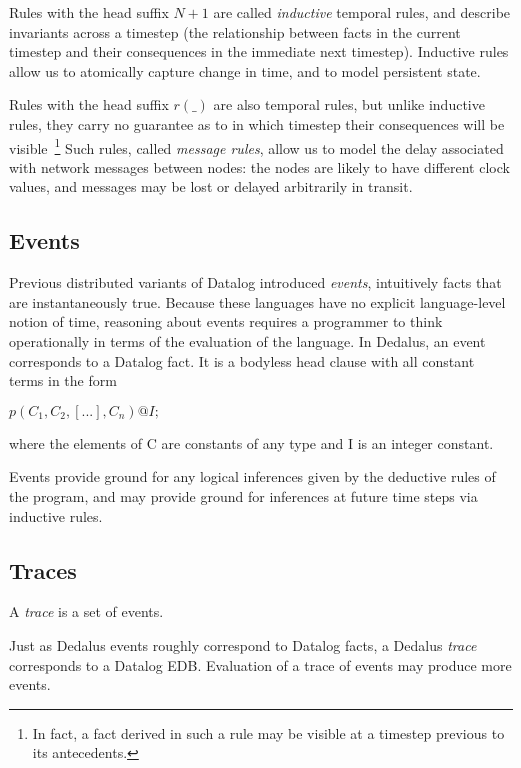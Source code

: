 \documentclass{acm_proc_article-sp-sigmod09}
\begin{document}
Rules with the head suffix $N + 1$ are called \emph{inductive} temporal rules,
and describe invariants across a timestep (the relationship between facts in
the current timestep and their consequences in the immediate next timestep).
Inductive rules allow us to atomically capture change in time, and to model
persistent state.

Rules with the head suffix $r(\_)$ are also temporal rules, but unlike
inductive rules, they carry no guarantee as to in which timestep their
consequences will be visible~\footnote{In fact, a fact derived in such a rule
may be visible at a timestep previous to its antecedents.} Such rules, called
{\em message rules}, allow us to model the delay associated with network
messages between nodes: the nodes are likely to have different clock values,
and messages may be lost or delayed arbitrarily in transit.


\subsection{Events}

Previous distributed variants of Datalog introduced {\em events}, intuitively
facts that are instantaneously true.  Because these languages have no explicit
language-level notion of time, reasoning about events requires a programmer to
think operationally in terms of the evaluation of the language.  In Dedalus,
an event corresponds to a Datalog fact.  It is a bodyless head clause with all 
constant terms in the form


$p(C_{1},C_{2},[...],C_{n})@I;$


where the elements of C are constants of any type and I is an integer constant.

Events provide ground for any logical inferences given by the deductive rules of the program, and may provide ground for inferences at 
future time steps via inductive rules.


\subsection{Traces}

\begin{definition}
A \emph{trace} is a set of events.
\end{definition}

Just as Dedalus events roughly correspond to Datalog facts, a Dedalus \emph{trace} corresponds to a Datalog EDB.
Evaluation of a trace of events may produce more events.
\end{document}
